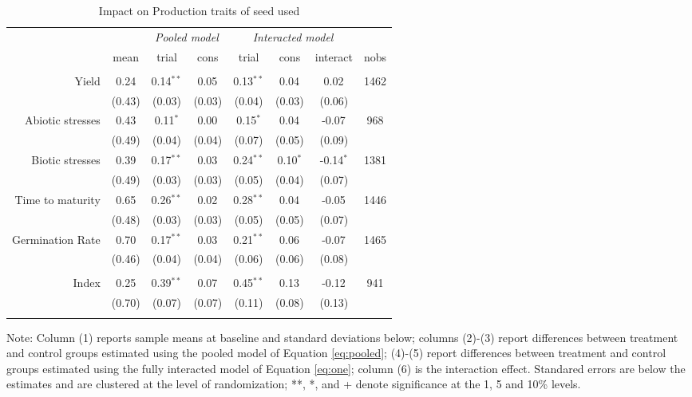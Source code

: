 \documentclass[english]{article}\usepackage[]{graphicx}\usepackage[]{xcolor}
\begin{document}
\begin{sidewaystable}
\caption{Impact on Production traits of seed used\label{prod_traits_used}}

\footnotesize
\begin{center}
\begin{tabular}{rccccccc}
\hline\hline
& & \multicolumn{2}{c}{\textit{Pooled model}} & \multicolumn{3}{c}{\textit{Interacted model}} \\
& mean & trial & cons & trial & cons & interact & nobs \\
\hline
\\
Yield
& 0.24
& 0.14$^{**}$
& 0.05$^{}$ 
& 0.13$^{**}$ 
& 0.04$^{}$
& 0.02$^{}$ & 1462 \\

& (0.43) & (0.03)  & (0.03) & (0.04)  & (0.03)  & (0.06)
 \\

Abiotic stresses
& 0.43
& 0.11$^{*}$
& 0.00$^{}$ 
& 0.15$^{*}$ 
& 0.04$^{}$
& -0.07$^{}$ & 968 \\

& (0.49) & (0.04)  & (0.04) & (0.07)  & (0.05)  & (0.09)
 \\

Biotic stresses
& 0.39
& 0.17$^{**}$
& 0.03$^{}$ 
& 0.24$^{**}$ 
& 0.10$^{*}$
& -0.14$^{*}$ & 1381 \\

& (0.49) & (0.03)  & (0.03) & (0.05)  & (0.04)  & (0.07)
 \\

Time to maturity
& 0.65
& 0.26$^{**}$
& 0.02$^{}$ 
& 0.28$^{**}$ 
& 0.04$^{}$
& -0.05$^{}$ & 1446 \\

& (0.48) & (0.03)  & (0.03) & (0.05)  & (0.05)  & (0.07)
 \\

Germination Rate
& 0.70
& 0.17$^{**}$
& 0.03$^{}$ 
& 0.21$^{**}$ 
& 0.06$^{}$
& -0.07$^{}$ & 1465 \\

& (0.46) & (0.04)  & (0.04) & (0.06)  & (0.06)  & (0.08)
 \\
\\
Index
& 0.25
& 0.39$^{**}$
& 0.07$^{}$ 
& 0.45$^{**}$ 
& 0.13$^{}$
& -0.12$^{}$ & 941 \\

& (0.70) & (0.07)  & (0.07) & (0.11)  & (0.08)  & (0.13)
 \\
\\
\hline\hline
\end{tabular}
\end{center}
\scriptsize
Note: Column (1) reports sample means at baseline and standard deviations below;  columns (2)-(3) report differences between treatment and control groups estimated using the pooled model of Equation  \ref{eq:pooled}; (4)-(5) report differences between treatment and control groups estimated using the fully interacted model of Equation \ref{eq:one}; column (6) is the interaction effect. Standared errors are below the estimates and are clustered at the level of randomization; **, *, and + denote significance at the 1, 5 and 10\% levels.
\end{sidewaystable}
\end{document}
